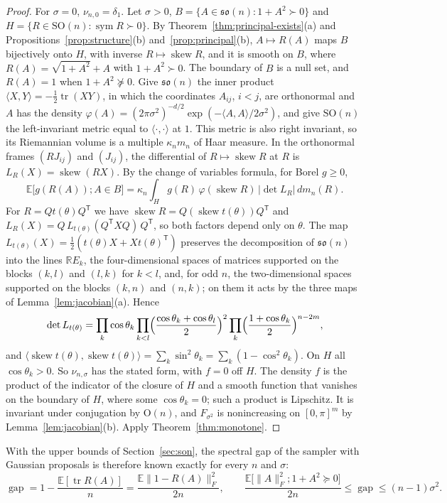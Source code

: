 \documentclass[11pt]{amsart}
\theoremstyle{definition}
\theoremstyle{remark}
\newcommand{\R}{\mathbb{R}}
\newcommand{\E}{\mathbb{E}}
\newcommand{\SO}{\mathrm{SO}}
\newcommand{\Or}{\mathrm{O}}
\newcommand{\tr}{\operatorname{tr}}
\newcommand{\sym}{\operatorname{sym}}
\newcommand{\skw}{\operatorname{skew}}
\newcommand{\fro}[1]{\lVert #1\rVert_{F}}
\newcommand{\ip}[2]{\langle #1,#2\rangle}
\newcommand{\gap}{\operatorname{gap}}
\newcommand{\transp}{^{\mathsf T}}
\begin{document}
\begin{proof}
For $\sigma=0$, $\nu_{n,0}=\delta_1$.  Let $\sigma>0$, $B=\{A\in\mathfrak{so}(n):1+A^2\succ0\}$ and
$H=\{R\in\SO(n):\sym R\succ0\}$.  By Theorem~\ref{thm:principal-exists}(a) and
Propositions~\ref{prop:structure}(b) and~\ref{prop:principal}(b), $A\mapsto R(A)$ maps $B$
bijectively onto $H$, with inverse $R\mapsto\skw R$, and it is smooth on $B$, where
$R(A)=\sqrt{1+A^2}+A$ with $1+A^2\succ0$.  The boundary of $B$ is a null set, and $R(A)=1$ when
$1+A^2\not\succeq0$.  Give $\mathfrak{so}(n)$ the inner product $\ip XY=-\frac12\tr(XY)$, in which
the coordinates $A_{ij}$, $i<j$, are orthonormal and $A$ has the density
$\varphi(A)=(2\pi\sigma^2)^{-d/2}\exp(-\ip AA/2\sigma^2)$, and give $\SO(n)$ the left-invariant
metric equal to $\ip\cdot\cdot$ at $1$.  This metric is also right invariant, so its Riemannian
volume is a multiple $\kappa_nm_n$ of Haar measure.  In the orthonormal frames $(RJ_{ij})$ and
$(J_{ij})$, the differential of $R\mapsto\skw R$ at $R$ is $L_R(X)=\skw(RX)$.  By the change of
variables formula, for Borel $g\ge0$,
\[
  \E\bigl[g(R(A));A\in B\bigr]=\kappa_n\int_Hg(R)\,\varphi(\skw R)\,|\det L_R|\,dm_n(R).
\]
For $R=Qt(\theta)Q\transp$ we have $\skw R=Q(\skw t(\theta))Q\transp$ and
$L_R(X)=Q\,L_{t(\theta)}(Q\transp XQ)\,Q\transp$, so both factors depend only on $\theta$.  The map
$L_{t(\theta)}(X)=\frac12(t(\theta)X+Xt(\theta)\transp)$ preserves the decomposition of
$\mathfrak{so}(n)$ into the lines $\R E_k$, the four-dimensional spaces of matrices supported on
the blocks $(k,l)$ and $(l,k)$ for $k<l$, and, for odd $n$, the two-dimensional spaces supported
on the blocks $(k,n)$ and $(n,k)$; on them it acts by the three maps of
Lemma~\ref{lem:jacobian}(a).  Hence
\[
  \det L_{t(\theta)}=\prod_k\cos\theta_k\prod_{k<l}\Bigl(\frac{\cos\theta_k+\cos\theta_l}2\Bigr)^2
  \prod_k\Bigl(\frac{1+\cos\theta_k}2\Bigr)^{n-2m},
\]
and $\ip{\skw t(\theta)}{\skw t(\theta)}=\sum_k\sin^2\theta_k=\sum_k(1-\cos^2\theta_k)$.  On $H$
all $\cos\theta_k>0$.  So $\nu_{n,\sigma}$ has the stated form, with $f=0$ off $H$.  The density
$f$ is the product of the indicator of the closure of $H$ and a smooth function that vanishes on
the boundary of $H$, where some $\cos\theta_k=0$; such a product is Lipschitz.  It is invariant
under conjugation by $\Or(n)$, and $F_{\sigma^2}$ is nonincreasing on $[0,\pi]^m$ by
Lemma~\ref{lem:jacobian}(b).  Apply Theorem~\ref{thm:monotone}.
\end{proof}

With the upper bounds of Section~\ref{sec:son}, the spectral gap of the sampler with Gaussian
proposals is therefore known exactly for every $n$ and $\sigma$:
\[
  \gap=1-\frac{\E[\tr R(A)]}n=\frac{\E\fro{1-R(A)}^2}{2n},\qquad
  \frac{\E\bigl[\fro{A}^2;1+A^2\succeq0\bigr]}{2n}\le\gap\le(n-1)\sigma^2 .
\]
\end{document}
